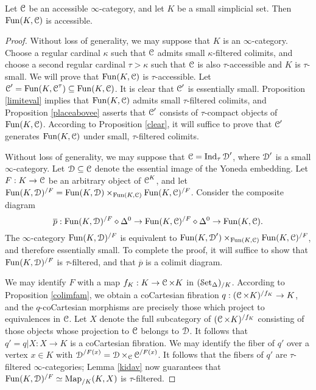 \begin{proposition}\label{horse1}
Let $\operatorname{\mathcal{C}}$ be an accessible $\infty$-category, and let $K$ be a small simplicial set. Then
$\operatorname{Fun}(K,\operatorname{\mathcal{C}})$ is accessible.
\end{proposition}

\begin{proof}
Without loss of generality, we may suppose that $K$ is an $\infty$-category.
Choose a regular cardinal $\kappa$ such that $\operatorname{\mathcal{C}}$ admits small $\kappa$-filtered colimits, and choose a second regular cardinal $\tau > \kappa$ such that $\operatorname{\mathcal{C}}$ is also $\tau$-accessible and $K$ is $\tau$-small.
We will prove that $\operatorname{Fun}(K,\operatorname{\mathcal{C}})$ is $\tau$-accessible. Let $\operatorname{\mathcal{C}}' = \operatorname{Fun}(K,\operatorname{\mathcal{C}}^{\tau}) \subseteq \operatorname{Fun}(K,\operatorname{\mathcal{C}})$. It is clear
that $\operatorname{\mathcal{C}}'$ is essentially small. Proposition \ref{limiteval} implies that $\operatorname{Fun}(K,\operatorname{\mathcal{C}})$ admits small $\tau$-filtered colimits, and Proposition \ref{placeabovee} asserts that $\operatorname{\mathcal{C}}'$ consists of $\tau$-compact objects of $\operatorname{Fun}(K,\operatorname{\mathcal{C}})$. According to Proposition \ref{clear}, it will suffice to prove that $\operatorname{\mathcal{C}}'$ generates $\operatorname{Fun}(K,\operatorname{\mathcal{C}})$ under small, $\tau$-filtered colimits.

Without loss of generality, we may suppose that $\operatorname{\mathcal{C}} = \operatorname{Ind}_{\tau} \operatorname{\mathcal{D}}'$, where $\operatorname{\mathcal{D}}'$ is a small $\infty$-category. Let $\operatorname{\mathcal{D}} \subseteq \operatorname{\mathcal{C}}$ denote the essential image of the Yoneda embedding. Let $F: K \rightarrow \operatorname{\mathcal{C}}$ be an arbitrary object of $\operatorname{\mathcal{C}}^K$, and let $\operatorname{Fun}(K,\operatorname{\mathcal{D}})^{/F} = \operatorname{Fun}(K,\operatorname{\mathcal{D}}) \times_{\operatorname{Fun}(K,\operatorname{\mathcal{C}})} \operatorname{Fun}(K,\operatorname{\mathcal{C}})^{/F}$. 
Consider the composite diagram
$$ \overline{p}: \operatorname{Fun}(K,\operatorname{\mathcal{D}})^{/F} \diamond \Delta^0 \rightarrow
\operatorname{Fun}(K,\operatorname{\mathcal{C}})^{/F} \diamond \Delta^0 \rightarrow \operatorname{Fun}(K,\operatorname{\mathcal{C}}).$$
The $\infty$-category $\operatorname{Fun}(K,\operatorname{\mathcal{D}})^{/F}$ is equivalent to 
$\operatorname{Fun}(K,\operatorname{\mathcal{D}}') \times_{\operatorname{Fun}(K,\operatorname{\mathcal{C}})} \operatorname{Fun}(K,\operatorname{\mathcal{C}})^{/F}$, and therefore essentially small.
To complete the proof, it will suffice to show that $\operatorname{Fun}(K,\operatorname{\mathcal{D}})^{/F}$ is $\tau$-filtered, and that
$\overline{p}$ is a colimit diagram.

We may identify $F$ with a map $f_K: K \rightarrow \operatorname{\mathcal{C}} \times K$ in $(\operatorname{\mathcal{S}et_{\Delta}})_{/K}$. According to 
Proposition \ref{colimfam}, we obtain a coCartesian fibration $q: (\operatorname{\mathcal{C}} \times K)^{/f_K} \rightarrow K$, 
and the $q$-coCartesian morphisms are precisely those which project to equivalences in $\operatorname{\mathcal{C}}$. Let
$X$ denote the full subcategory of $(\operatorname{\mathcal{C}} \times K)^{/f_K}$ consisting of those objects whose projection to $\operatorname{\mathcal{C}}$ belongs to $\operatorname{\mathcal{D}}$. It follows that $q' = q|X: X \rightarrow K$ is a coCartesian fibration. We may identify the fiber of $q'$ over a vertex
$x \in K$ with $\operatorname{\mathcal{D}}^{/F(x)} = \operatorname{\mathcal{D}} \times_{\operatorname{\mathcal{C}}} \operatorname{\mathcal{C}}^{/F(x)}$. It follows that the fibers
of $q'$ are $\tau$-filtered $\infty$-categories; Lemma \ref{kidav} now guarantees that
$\operatorname{Fun}(K,\operatorname{\mathcal{D}})^{/F} \simeq \operatorname{{Map}}_{/K}(K,X)$ is $\tau$-filtered.


\end{proof}
